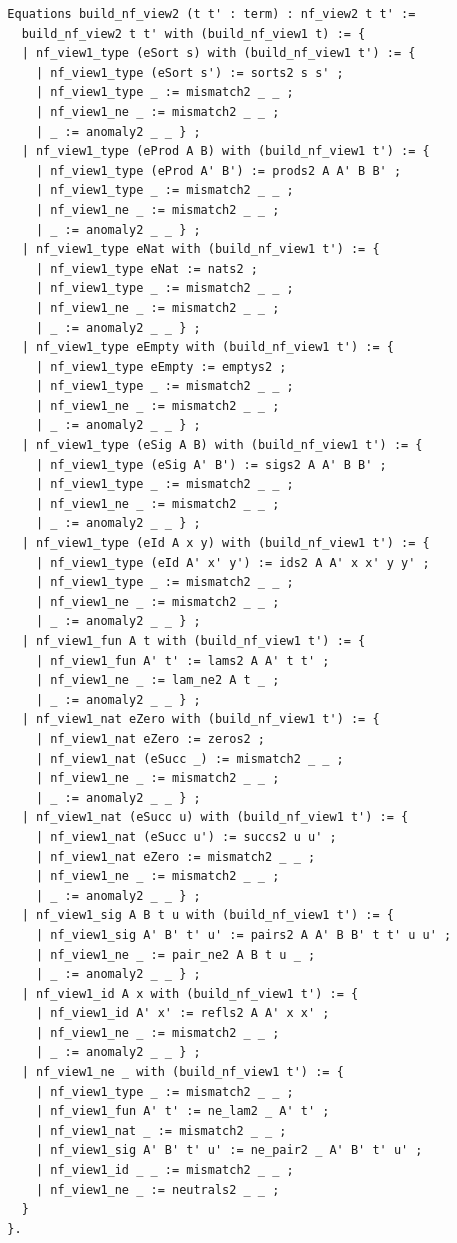 \documentclass[10pt,a4paper]{amsart}
\begin{document}
\begin{lstlisting}
  Equations build_nf_view2 (t t' : term) : nf_view2 t t' :=
    build_nf_view2 t t' with (build_nf_view1 t) := {
    | nf_view1_type (eSort s) with (build_nf_view1 t') := {
      | nf_view1_type (eSort s') := sorts2 s s' ;
      | nf_view1_type _ := mismatch2 _ _ ;
      | nf_view1_ne _ := mismatch2 _ _ ;
      | _ := anomaly2 _ _ } ;
    | nf_view1_type (eProd A B) with (build_nf_view1 t') := {
      | nf_view1_type (eProd A' B') := prods2 A A' B B' ;
      | nf_view1_type _ := mismatch2 _ _ ;
      | nf_view1_ne _ := mismatch2 _ _ ;
      | _ := anomaly2 _ _ } ;
    | nf_view1_type eNat with (build_nf_view1 t') := {
      | nf_view1_type eNat := nats2 ;
      | nf_view1_type _ := mismatch2 _ _ ;
      | nf_view1_ne _ := mismatch2 _ _ ;
      | _ := anomaly2 _ _ } ;
    | nf_view1_type eEmpty with (build_nf_view1 t') := {
      | nf_view1_type eEmpty := emptys2 ;
      | nf_view1_type _ := mismatch2 _ _ ;
      | nf_view1_ne _ := mismatch2 _ _ ; 
      | _ := anomaly2 _ _ } ;
    | nf_view1_type (eSig A B) with (build_nf_view1 t') := {
      | nf_view1_type (eSig A' B') := sigs2 A A' B B' ;
      | nf_view1_type _ := mismatch2 _ _ ;
      | nf_view1_ne _ := mismatch2 _ _ ;
      | _ := anomaly2 _ _ } ;
    | nf_view1_type (eId A x y) with (build_nf_view1 t') := {
      | nf_view1_type (eId A' x' y') := ids2 A A' x x' y y' ;
      | nf_view1_type _ := mismatch2 _ _ ;
      | nf_view1_ne _ := mismatch2 _ _ ;
      | _ := anomaly2 _ _ } ;
    | nf_view1_fun A t with (build_nf_view1 t') := {
      | nf_view1_fun A' t' := lams2 A A' t t' ;
      | nf_view1_ne _ := lam_ne2 A t _ ; 
      | _ := anomaly2 _ _ } ;
    | nf_view1_nat eZero with (build_nf_view1 t') := {
      | nf_view1_nat eZero := zeros2 ;
      | nf_view1_nat (eSucc _) := mismatch2 _ _ ;
      | nf_view1_ne _ := mismatch2 _ _ ; 
      | _ := anomaly2 _ _ } ;
    | nf_view1_nat (eSucc u) with (build_nf_view1 t') := {
      | nf_view1_nat (eSucc u') := succs2 u u' ;
      | nf_view1_nat eZero := mismatch2 _ _ ;
      | nf_view1_ne _ := mismatch2 _ _ ; 
      | _ := anomaly2 _ _ } ;
    | nf_view1_sig A B t u with (build_nf_view1 t') := {
      | nf_view1_sig A' B' t' u' := pairs2 A A' B B' t t' u u' ;
      | nf_view1_ne _ := pair_ne2 A B t u _ ; 
      | _ := anomaly2 _ _ } ;
    | nf_view1_id A x with (build_nf_view1 t') := {
      | nf_view1_id A' x' := refls2 A A' x x' ;
      | nf_view1_ne _ := mismatch2 _ _ ;
      | _ := anomaly2 _ _ } ;
    | nf_view1_ne _ with (build_nf_view1 t') := {
      | nf_view1_type _ := mismatch2 _ _ ;
      | nf_view1_fun A' t' := ne_lam2 _ A' t' ;
      | nf_view1_nat _ := mismatch2 _ _ ;
      | nf_view1_sig A' B' t' u' := ne_pair2 _ A' B' t' u' ;
      | nf_view1_id _ _ := mismatch2 _ _ ;
      | nf_view1_ne _ := neutrals2 _ _ ;
    }
  }.


\end{lstlisting}
\end{document}

